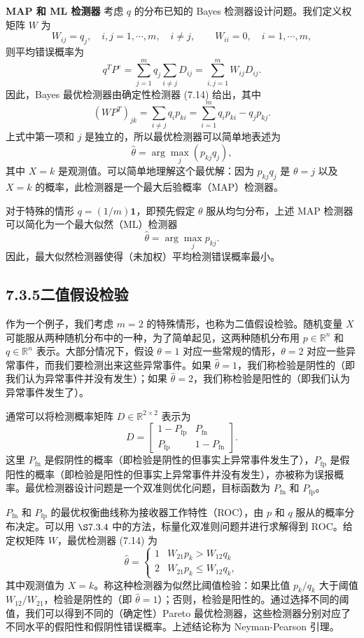 \documentclass[UTF8, 12pt, fontset=fandol, oneside]{ctexart}
\begin{document}
\noindent\textbf{MAP 和 ML 检测器}\quad
考虑 $q$ 的分布已知的 Bayes 检测器设计问题。我们定义权矩阵 $W$ 为
\[
W_{ij}=q_j,\quad i,j=1,\cdots,m,\quad i\neq j,\qquad
W_{ii}=0,\quad i=1,\cdots,m,
\]
则平均错误概率为
\[
q^TP^e=\sum_{j=1}^m q_j\sum_{i\neq j}D_{ij}=\sum_{i,j=1}^m W_{ij}D_{ij}.
\]
因此，Bayes 最优检测器由确定性检测器 (7.14) 给出，其中
\[
(WP^T)_{jk}=\sum_{i\neq j}q_i p_{ki}=\sum_{i=1}^m q_i p_{ki}-q_jp_{kj}.
\]
上式中第一项和 $j$ 是独立的，所以最优检测器可以简单地表述为
\[
\hat{\theta}=\arg\max_j(p_{kj}q_j),
\]
其中 $X=k$ 是观测值。可以简单地理解这个最优解：因为 $p_{kj}q_j$ 是 $\theta=j$ 以及 $X=k$ 的概率，此检测器是一个最大后验概率（MAP）检测器。

对于特殊的情形 $q=(1/m)\mathbf{1}$，即预先假定 $\theta$ 服从均匀分布，上述 MAP 检测器可以简化为一个最大似然（ML）检测器
\[
\hat{\theta}=\arg\max_j p_{kj}.
\]
因此，最大似然检测器使得（未加权）平均检测错误概率最小。

\subsection*{7.3.5\quad 二值假设检验}

作为一个例子，我们考虑 $m=2$ 的特殊情形，也称为二值假设检验。随机变量 $X$ 可能服从两种随机分布中的一种，为了简单起见，这两种随机分布用 $p\in\mathbb{R}^n$ 和 $q\in\mathbb{R}^n$ 表示。大部分情况下，假设 $\theta=1$ 对应一些常规的情形，$\theta=2$ 对应一些异常事件，而我们要检测出来这些异常事件。如果 $\hat{\theta}=1$，我们称检验是阴性的（即我们认为异常事件并没有发生）；如果 $\hat{\theta}=2$，我们称检验是阳性的（即我们认为异常事件发生了）。

通常可以将检测概率矩阵 $D\in\mathbb{R}^{2\times 2}$ 表示为
\[
D=
\begin{bmatrix}
1-P_{\mathrm{fp}} & P_{\mathrm{fn}}\\
P_{\mathrm{fp}} & 1-P_{\mathrm{fn}}
\end{bmatrix}.
\]
这里 $P_{\mathrm{fn}}$ 是假阴性的概率（即检验是阴性的但事实上异常事件发生了），$P_{\mathrm{fp}}$ 是假阳性的概率（即检验是阳性的但事实上异常事件并没有发生），亦被称为误报概率。最优检测器设计问题是一个双准则优化问题，目标函数为 $P_{\mathrm{fn}}$ 和 $P_{\mathrm{fp}}$。

$P_{\mathrm{fn}}$ 和 $P_{\mathrm{fp}}$ 的最优权衡曲线称为接收器工作特性（ROC），由 $p$ 和 $q$ 服从的概率分布决定。可以用 $\S 7.3.4$ 中的方法，标量化双准则问题并进行求解得到 ROC。给定权矩阵 $W$，最优检测器 (7.14) 为
\[
\hat{\theta}=
\begin{cases}
1 & W_{21}p_k>W_{12}q_k\\
2 & W_{21}p_k\leq W_{12}q_k,
\end{cases}
\]
其中观测值为 $X=k$。称这种检测器为似然比阈值检验：如果比值 $p_k/q_k$ 大于阈值 $W_{12}/W_{21}$，检验是阴性的（即 $\hat{\theta}=1$）；否则，检验是阳性的。通过选择不同的阈值，我们可以得到不同的（确定性）Pareto 最优检测器，这些检测器分别对应了不同水平的假阳性和假阴性错误概率。上述结论称为 Neyman-Pearson 引理。
\end{document}
